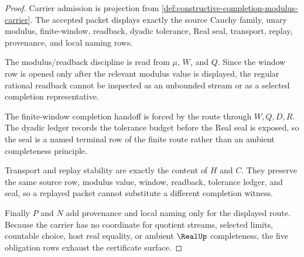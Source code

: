 \begin{proof}
Carrier admission is projection from \autoref{def:constructive-completion-modulus-carrier}. The accepted packet displays exactly the source Cauchy family, unary modulus, finite-window, readback, dyadic tolerance, Real seal, transport, replay, provenance, and local naming rows.

The modulus/readback discipline is read from $\mu$, $W$, and $Q$. Since the window row is opened only after the relevant modulus value is displayed, the regular rational readback cannot be inspected as an unbounded stream or as a selected completion representative.

The finite-window completion handoff is forced by the route through $W,Q,D,R$. The dyadic ledger records the tolerance budget before the Real seal is exposed, so the seal is a named terminal row of the finite route rather than an ambient completeness principle.

Transport and replay stability are exactly the content of $H$ and $C$. They preserve the same source row, modulus value, window, readback, tolerance ledger, and seal, so a replayed packet cannot substitute a different completion witness.

Finally $P$ and $N$ add provenance and local naming only for the displayed route. Because the carrier has no coordinate for quotient streams, selected limits, countable choice, host real equality, or ambient $\RealUp$ completeness, the five obligation rows exhaust the certificate surface.
\end{proof}

